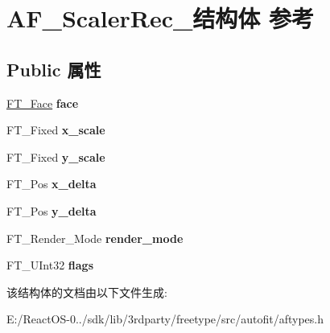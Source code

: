 \hypertarget{struct_a_f___scaler_rec__}{}\section{A\+F\+\_\+\+Scaler\+Rec\+\_\+结构体 参考}
\label{struct_a_f___scaler_rec__}
\subsection*{Public 属性}
\begin{DoxyCompactItemize}
\item 
\mbox{\label{struct_a_f___scaler_rec___a71f2b3394cdec1497970e082299cedf8}} 
\hyperlink{struct_f_t___face_rec__}{F\+T\+\_\+\+Face} {\bfseries face}
\item 
\mbox{\label{struct_a_f___scaler_rec___acc8f40b57f6c142801cae42ab2304c6b}} 
F\+T\+\_\+\+Fixed {\bfseries x\+\_\+scale}
\item 
\mbox{\label{struct_a_f___scaler_rec___aa5074c2d767b7b2b88cce17170804a17}} 
F\+T\+\_\+\+Fixed {\bfseries y\+\_\+scale}
\item 
\mbox{\label{struct_a_f___scaler_rec___a806f45a9ef06653df58974f5c180b447}} 
F\+T\+\_\+\+Pos {\bfseries x\+\_\+delta}
\item 
\mbox{\label{struct_a_f___scaler_rec___a4268e4713bf34c85bbb004867f6a421d}} 
F\+T\+\_\+\+Pos {\bfseries y\+\_\+delta}
\item 
\mbox{\label{struct_a_f___scaler_rec___a16a5cb8f74254cae911565d3aa35472e}} 
F\+T\+\_\+\+Render\+\_\+\+Mode {\bfseries render\+\_\+mode}
\item 
\mbox{\label{struct_a_f___scaler_rec___a054820659ad76b27637a6e0b214b1ec5}} 
F\+T\+\_\+\+U\+Int32 {\bfseries flags}
\end{DoxyCompactItemize}


该结构体的文档由以下文件生成\+:\begin{DoxyCompactItemize}
\item 
E\+:/\+React\+O\+S-\/0../sdk/lib/3rdparty/freetype/src/autofit/aftypes.\+h\end{DoxyCompactItemize}
